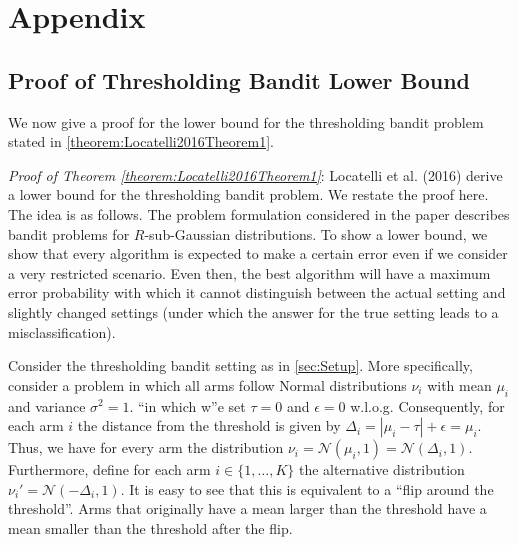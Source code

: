 \documentclass[11pt,]{article}
\begin{document}
\newpage

\section{Appendix}\label{appendix}

\subsection{\texorpdfstring{Proof of Thresholding Bandit Lower Bound
\label{sec:AppendixAPTLB}}{Proof of Thresholding Bandit Lower Bound }}\label{proof-of-thresholding-bandit-lower-bound}

We now give a proof for the lower bound for the thresholding bandit
problem stated in \autoref{theorem:Locatelli2016Theorem1}.

\emph{Proof of Theorem \ref{theorem:Locatelli2016Theorem1}}: Locatelli
et al. (2016) derive a lower bound for the thresholding bandit problem.
We restate the proof here. The idea is as follows. The problem
formulation considered in the paper describes bandit problems for
\(R\)-sub-Gaussian distributions. To show a lower bound, we show that
every algorithm is expected to make a certain error even if we consider
a very restricted scenario. Even then, the best algorithm will have a
maximum error probability with which it cannot distinguish between the
actual setting and slightly changed settings (under which the answer for
the true setting leads to a misclassification).

Consider the thresholding bandit setting as in \autoref{sec:Setup}. More
specifically, consider a problem in which all arms follow Normal
distributions \(\nu_i\) with mean \(\mu_i\) and variance
\(\sigma^2 = 1\). ``in which w''e set \(\tau = 0\) and \(\epsilon = 0\)
w.l.o.g. Consequently, for each arm \(i\) the distance from the
threshold is given by \(\Delta_i = |\mu_i - \tau| + \epsilon = \mu_i\).
Thus, we have for every arm the distribution
\(\nu_i = \mathcal{N}(\mu_i,1) = \mathcal{N}(\Delta_i,1)\). Furthermore,
define for each arm \(i \in \{1, \dots, K\}\) the alternative
distribution \(\nu_i' = \mathcal{N}(-\Delta_i,1)\). It is easy to see
that this is equivalent to a ``flip around the threshold''. Arms that
originally have a mean larger than the threshold have a mean smaller
than the threshold after the flip.
\end{document}

